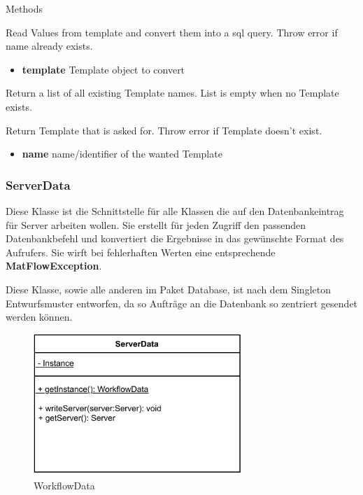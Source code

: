 \begin{methodenv}{Methods}
	
Read Values from template and convert them into a sql query.
Throw error if name already exists.

\begin{itemize}
	\item \textbf{template}
	Template object to convert
\end{itemize}

Return a list of all existing Template names.
List is empty when no Template exists.

Return Template that is asked for.
Throw error if Template doesn't exist.

\begin{itemize}
	\item \textbf{name}
	name/identifier of the wanted Template
\end{itemize}

\end{methodenv}

\subsubsection{ServerData}
Diese Klasse ist die Schnittstelle für alle Klassen die auf den Datenbankeintrag für Server arbeiten wollen. Sie erstellt für jeden Zugriff den passenden Datenbankbefehl und konvertiert die Ergebnisse in das gewünschte Format des Aufrufers.
Sie wirft bei fehlerhaften Werten eine entsprechende \textbf{MatFlowException}.

Diese Klasse, sowie alle anderen im Paket Database, ist nach dem Singleton Entwurfsmuster entworfen, da so Aufträge an die Datenbank so zentriert gesendet werden können.
\begin{figure}[h]
	\centering
	\includegraphics[width=0.7\textwidth]{res/Klassen/ServerData.pdf} 
	\caption{WorkflowData}
	\label{fig:workflowDataClass}
\end{figure}

